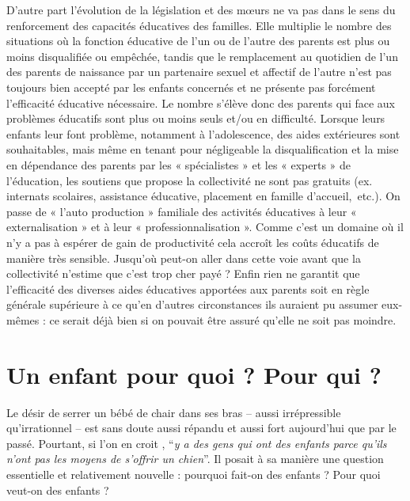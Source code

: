D'autre part l'évolution de la législation et des mœurs ne va pas dans le sens du renforcement des capacités éducatives des familles. Elle multiplie le nombre des situations où la fonction éducative de l'un ou de l'autre des parents est plus ou moins disqualifiée ou empêchée, tandis que le remplacement au quotidien de l'un des parents de naissance par un partenaire sexuel et affectif de l'autre n'est pas toujours bien accepté par les enfants concernés et ne présente pas forcément l'efficacité éducative nécessaire. Le nombre s'élève donc des parents qui face aux problèmes éducatifs sont plus ou moins seuls et/ou en difficulté. Lorsque leurs enfants leur font problème, notamment à l'adolescence, des aides extérieures sont souhaitables, mais même en tenant pour négligeable la disqualification et la mise en dépendance des parents par les « spécialistes » et les « experts » de l'éducation, les soutiens que propose la collectivité ne sont pas gratuits (ex. internats scolaires, assistance éducative, placement en famille d'accueil,~etc.). On passe de « l'auto production » familiale des activités éducatives à leur « externalisation » et à leur « professionnalisation ». Comme c'est un domaine où il n'y a pas à espérer de gain de productivité cela accroît les coûts éducatifs de manière très sensible. Jusqu'où peut-on aller dans cette voie avant que la collectivité n'estime que c'est trop cher payé ? Enfin rien ne garantit que l'efficacité des diverses aides éducatives apportées aux parents soit en règle générale supérieure à ce qu'en d'autres circonstances ils auraient pu assumer eux-mêmes : ce serait déjà bien si on pouvait être assuré qu'elle ne soit pas moindre. 

 \chapter{Un enfant pour quoi ? Pour qui ?}


Le désir de serrer un bébé de chair dans ses bras -- aussi irrépressible qu'irrationnel -- est sans doute aussi répandu et aussi fort aujourd'hui que par le passé. Pourtant, si l'on en croit , \enquote{\emph{y a des gens qui ont des enfants parce qu'ils n'ont pas les moyens de s'offrir un chien}}. Il posait à sa manière une question essentielle et relativement nouvelle : pourquoi fait-on des enfants ? Pour quoi veut-on des enfants ?


